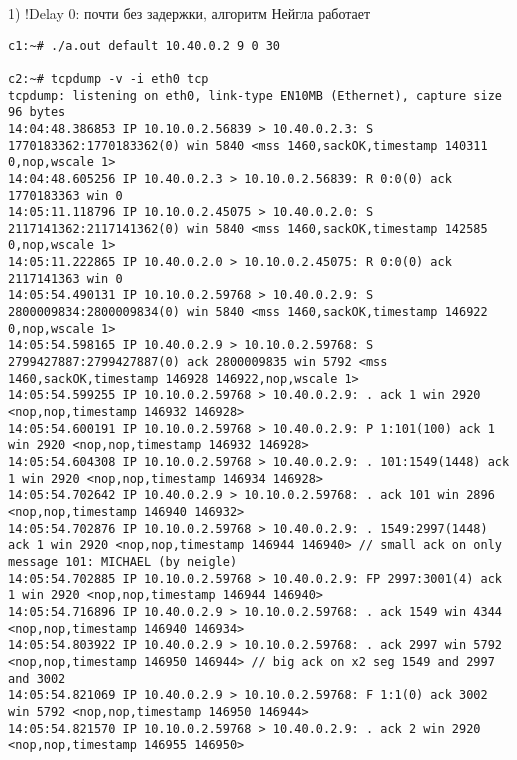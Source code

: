 \documentclass[a4paper,12pt]{article}
\begin{document}
1) !Delay 0: почти без задержки, алгоритм Нейгла работает
\begin{lstlisting}
c1:~# ./a.out default 10.40.0.2 9 0 30

c2:~# tcpdump -v -i eth0 tcp
tcpdump: listening on eth0, link-type EN10MB (Ethernet), capture size 96 bytes
14:04:48.386853 IP 10.10.0.2.56839 > 10.40.0.2.3: S 1770183362:1770183362(0) win 5840 <mss 1460,sackOK,timestamp 140311 0,nop,wscale 1>
14:04:48.605256 IP 10.40.0.2.3 > 10.10.0.2.56839: R 0:0(0) ack 1770183363 win 0
14:05:11.118796 IP 10.10.0.2.45075 > 10.40.0.2.0: S 2117141362:2117141362(0) win 5840 <mss 1460,sackOK,timestamp 142585 0,nop,wscale 1>
14:05:11.222865 IP 10.40.0.2.0 > 10.10.0.2.45075: R 0:0(0) ack 2117141363 win 0
14:05:54.490131 IP 10.10.0.2.59768 > 10.40.0.2.9: S 2800009834:2800009834(0) win 5840 <mss 1460,sackOK,timestamp 146922 0,nop,wscale 1>
14:05:54.598165 IP 10.40.0.2.9 > 10.10.0.2.59768: S 2799427887:2799427887(0) ack 2800009835 win 5792 <mss 1460,sackOK,timestamp 146928 146922,nop,wscale 1>
14:05:54.599255 IP 10.10.0.2.59768 > 10.40.0.2.9: . ack 1 win 2920 <nop,nop,timestamp 146932 146928>
14:05:54.600191 IP 10.10.0.2.59768 > 10.40.0.2.9: P 1:101(100) ack 1 win 2920 <nop,nop,timestamp 146932 146928>
14:05:54.604308 IP 10.10.0.2.59768 > 10.40.0.2.9: . 101:1549(1448) ack 1 win 2920 <nop,nop,timestamp 146934 146928>
14:05:54.702642 IP 10.40.0.2.9 > 10.10.0.2.59768: . ack 101 win 2896 <nop,nop,timestamp 146940 146932>
14:05:54.702876 IP 10.10.0.2.59768 > 10.40.0.2.9: . 1549:2997(1448) ack 1 win 2920 <nop,nop,timestamp 146944 146940> // small ack on only message 101: MICHAEL (by neigle)
14:05:54.702885 IP 10.10.0.2.59768 > 10.40.0.2.9: FP 2997:3001(4) ack 1 win 2920 <nop,nop,timestamp 146944 146940>
14:05:54.716896 IP 10.40.0.2.9 > 10.10.0.2.59768: . ack 1549 win 4344 <nop,nop,timestamp 146940 146934>
14:05:54.803922 IP 10.40.0.2.9 > 10.10.0.2.59768: . ack 2997 win 5792 <nop,nop,timestamp 146950 146944> // big ack on x2 seg 1549 and 2997 and 3002 
14:05:54.821069 IP 10.40.0.2.9 > 10.10.0.2.59768: F 1:1(0) ack 3002 win 5792 <nop,nop,timestamp 146950 146944>
14:05:54.821570 IP 10.10.0.2.59768 > 10.40.0.2.9: . ack 2 win 2920 <nop,nop,timestamp 146955 146950>
\end{lstlisting}
\end{document}
